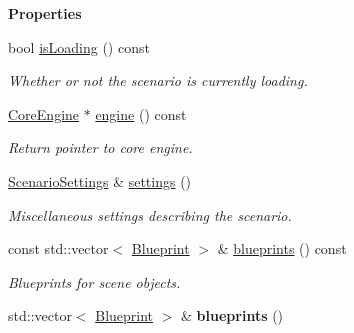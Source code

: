 \begin{Indent}\textbf{ Properties}\par
\begin{DoxyCompactItemize}
\item 
\mbox{\label{classrev_1_1_scenario_a5ee33f430218ff0d14d3f6fc46251fec}} 
bool \mbox{\hyperlink{classrev_1_1_scenario_a5ee33f430218ff0d14d3f6fc46251fec}{is\+Loading}} () const
\begin{DoxyCompactList}\small\item\em Whether or not the scenario is currently loading. \end{DoxyCompactList}\item 
\mbox{\hyperlink{classrev_1_1_core_engine}{Core\+Engine}} $\ast$ \mbox{\hyperlink{classrev_1_1_scenario_a5a8f8fe6743bdad9002ee3cd1c45005f}{engine}} () const
\begin{DoxyCompactList}\small\item\em Return pointer to core engine. \end{DoxyCompactList}\item 
\mbox{\label{classrev_1_1_scenario_a39ba0472e926372014a0d303cb61b6b4}} 
\mbox{\hyperlink{classrev_1_1_scenario_settings}{Scenario\+Settings}} \& \mbox{\hyperlink{classrev_1_1_scenario_a39ba0472e926372014a0d303cb61b6b4}{settings}} ()
\begin{DoxyCompactList}\small\item\em Miscellaneous settings describing the scenario. \end{DoxyCompactList}\item 
\mbox{\label{classrev_1_1_scenario_a3ea93c3ee3840d88fb9e367fa2d97842}} 
const std\+::vector$<$ \mbox{\hyperlink{classrev_1_1_blueprint}{Blueprint}} $>$ \& \mbox{\hyperlink{classrev_1_1_scenario_a3ea93c3ee3840d88fb9e367fa2d97842}{blueprints}} () const
\begin{DoxyCompactList}\small\item\em Blueprints for scene objects. \end{DoxyCompactList}\item 
\mbox{\label{classrev_1_1_scenario_a894472e17d606972ca7a107053bce88c}} 
std\+::vector$<$ \mbox{\hyperlink{classrev_1_1_blueprint}{Blueprint}} $>$ \& {\bfseries blueprints} ()
\end{DoxyCompactItemize}
\end{Indent}
